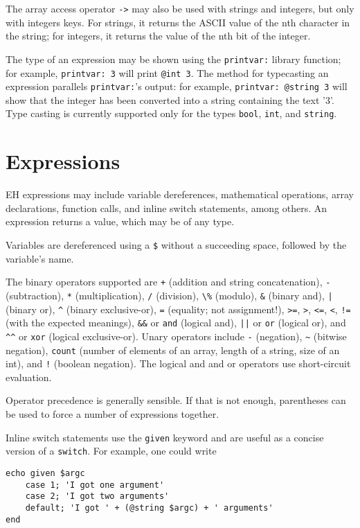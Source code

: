 \documentclass{article}
\begin{document}
The array access operator \verb#-># may also be used with strings and integers, but only with integers keys. For strings, it returns the ASCII value of the nth character in the string; for integers, it returns the value of the nth bit of the integer.

The type of an expression may be shown using the \verb#printvar:# library function; for example, \verb#printvar: 3# will print \verb#@int 3#. The method for typecasting an expression parallels \verb#printvar:#'s output: for example, \verb#printvar: @string 3# will show that the integer has been converted into a string containing the text '3'. Type casting is currently supported only for the types \verb#bool#, \verb#int#, and \verb#string#.

\section{Expressions}
EH expressions may include variable dereferences, mathematical operations, array declarations, function calls, and inline switch statements, among others. An expression returns a value, which may be of any type.

Variables are dereferenced using a \verb#$# without a succeeding space, followed by the variable's name.

The binary operators supported are \verb#+# (addition and string concatenation), \verb#-# (subtraction), \verb#*# (multiplication), \verb#/# (division), \verb#\%# (modulo), \verb#&# (binary and), \verb#|# (binary or), \verb#^# (binary exclusive-or), \verb#=# (equality; not assignment!), \verb#>=#, \verb#>#, \verb#<=#, \verb#<#, \verb#!=# (with the expected meanings), \verb#&&# or \verb#and# (logical and), \verb#||# or \verb#or# (logical or), and \verb#^^# or \verb#xor# (logical exclusive-or). Unary operators include \verb#-# (negation), \verb#~# (bitwise negation), \verb#count# (number of elements of an array, length of a string, size of an int), and \verb#!# (boolean negation). The logical and and or operators use short-circuit evaluation.

Operator precedence is generally sensible. If that is not enough, parentheses can be used to force a number of expressions together.

Inline switch statements use the \verb#given# keyword and are useful as a concise version of a \verb#switch#. For example, one could write
\begin{verbatim}
echo given $argc
	case 1; 'I got one argument'
	case 2; 'I got two arguments'
	default; 'I got ' + (@string $argc) + ' arguments'
end
\end{verbatim}
\end{document}
